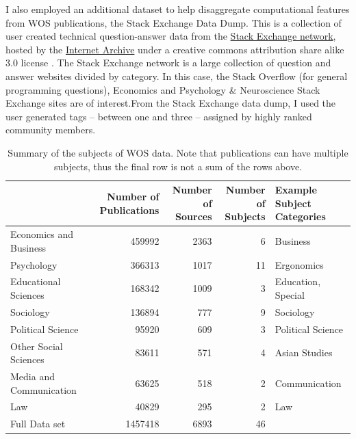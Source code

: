 \documentclass[12pt, a4paper]{article}
\begin{document}
I also employed an additional dataset to help disaggregate computational features from WOS publications, the Stack Exchange Data Dump. This is a collection of user created technical question-answer data from the \href{http://stackexchange.com/}{Stack Exchange network}, hosted by the \href{https://archive.org/details/stackexchange}{Internet Archive} under a creative commons attribution share alike 3.0 license \citep{StackExchange}. The Stack Exchange network is a large collection of question and answer websites divided by category. In this case, the Stack Overflow (for general programming questions), Economics and Psychology \& Neuroscience Stack Exchange sites are of interest.From the Stack Exchange data dump, I used the user generated tags -- between one and three -- assigned by highly ranked community members.

\begin{table}[h]
	\centering
	\begin{adjustbox}{center}
		\begin{tabular}{lrrrl}
			\toprule
			{} &  \pbox{20cm}{Number of \\Publications}  &  \pbox{20cm}{Number of\\Sources}&  \pbox{20cm}{Number of \\Subjects} &   \pbox{20cm}{Example Subject\\Categories} \\
			\midrule
			Economics and Business  &            \num{459992} &              \num{2363} &                  \num{6} &            Business \\
			Psychology              &            \num{366313} &              \num{1017} &                 \num{11} &          Ergonomics \\
			Educational Sciences    &            \num{168342} &              \num{1009} &                  \num{3} &  Education, Special \\
			Sociology               &            \num{136894} &               \num{777} &                  \num{9} &           Sociology \\
			Political Science       &             \num{95920} &               \num{609} &                  \num{3} &   Political Science \\
			Other Social Sciences   &             \num{83611} &               \num{571} &                  \num{4} &       Asian Studies \\
			Media and Communication &             \num{63625} &               \num{518} &                  \num{2} &       Communication \\
			Law                     &             \num{40829} &               \num{295} &                  \num{2} &                 Law \\
			\midrule
			Full Data set           &           \num{1457418} &              \num{6893} &                 \num{46} &                     \\
			\bottomrule
		\end{tabular}
	\end{adjustbox}
	\caption{Summary of the subjects of WOS data. Note that publications can have multiple subjects, thus the final row is not a sum of the rows above.}\label{sum_1}
\end{table}
\end{document}
